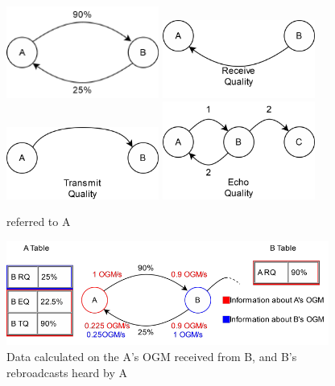\documentclass{article}
\begin{document}
\begin{figure}
    \centering
        \includegraphics[width=5cm]{img/Asymetric.pdf}
    \qquad
        \includegraphics[width=5cm]{img/ReceiveQuality.pdf} 
    \label{fig:example1}
    \centering
        \includegraphics[width=5cm]{img/TransmitQuality.pdf} 
    \qquad
        \includegraphics[width=5cm]{img/EchoQuality.pdf} 
    \label{fig:example}
    \caption{referred to A}
    
\end{figure}

\begin{figure}
  \includegraphics[width=300pt]{img/A-OGM.pdf}
  \caption{Data calculated on the A's OGM received from B, and B's rebroadcasts heard by A}
  \label{fig:calc}
\end{figure}
\end{document}
